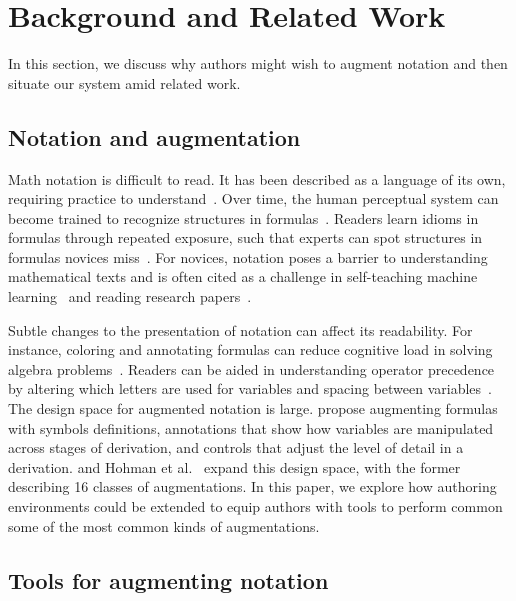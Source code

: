 \section{Background and Related Work}

In this section, we discuss why authors might wish to augment notation and then situate our system amid related work.

\subsection{Notation and augmentation}

Math notation is difficult to read. It has been described as a language of its own, requiring practice to understand~\cite{ref:adams2003reading}. Over time, the human perceptual system can become trained to recognize structures in formulas~\cite{ref:marghetis2016mastering}. Readers learn idioms in formulas through repeated exposure, such that experts can spot structures in formulas novices miss~\cite{ref:shepherd2014reading}. For novices, notation poses a barrier to understanding mathematical texts and is often cited as a challenge in self-teaching machine learning~\cite{ref:cai2019software} and reading research papers~\cite{ref:mysore2023how}.

Subtle changes to the presentation of notation can affect its readability. For instance, coloring and annotating formulas can reduce cognitive load in solving algebra problems~\cite{ref:yung2015effects}. Readers can be aided in understanding operator precedence by altering which letters are used for variables and spacing between variables~\cite{ref:goldstone2017adapting,ref:harrison2020spacing}. The design space for augmented notation is large. \citet{ref:dragunov2003designing} propose augmenting formulas with symbols definitions, annotations that show how variables are manipulated across stages of derivation, and controls that adjust the level of detail in a derivation. \citet{ref:head2022math} and Hohman et al.~\cite{ref:hohman2020awesome} expand this design space, with the former describing 16 classes of augmentations.
In this paper, we explore how authoring environments could be extended to equip authors with tools to perform common some of the most common kinds of augmentations.

\subsection{Tools for augmenting notation}

